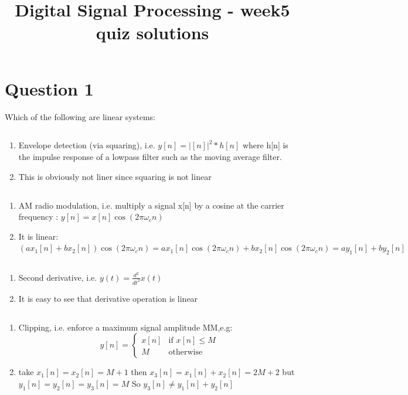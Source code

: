 \documentclass[a4paper]{article}
\title{Digital Signal Processing - week5 quiz solutions}
\begin{document}
\maketitle

\section{Question 1}
Which of the following are linear systems:

\subsection{} 
\begin{enumerate}
\item Envelope detection (via squaring), i.e. $y[n] = \vert[n]\vert^2 \ast h[n]$
 where h[n] is the impulse response of a lowpass filter such as the moving average filter.
\item This is obviously not liner since squaring is not linear
\end{enumerate}

\subsection{}
\begin{enumerate}
\item AM radio modulation, i.e. multiply a signal x[n] by a cosine at the carrier frequency :
$y[n]= x[n]\cos(2\pi\omega_cn)$
\item It is linear:  $(ax_1[n]+bx_2[n])\cos(2\pi\omega_cn) = ax_1[n]\cos(2\pi\omega_cn)+bx_2[n]\cos(2\pi\omega_cn) = ay_1[n]+by_2[n]$
\end{enumerate}

\subsection{}
\begin{enumerate}
\item Second derivative, i.e. $y(t) = \frac{d^2}{dt^2}x(t)$
\item It is easy to see that derivative operation is linear
\end{enumerate}

\subsection{}
\begin{enumerate}
\item Clipping, i.e. enforce a maximum signal amplitude MM,e.g: 
$$
y[n] = \begin{cases} x[n] &\mbox{if } x[n] \leq M  \\
M & \mbox{otherwise } \end{cases} 
$$
\item take $x_1[n]=x_2[n] =M+1$ then $x_3[n] = x_1[n]+x_2[n] = 2M+2$ but $y_1[n]=y_2[n] = y_3[n] = M$
So $y_3[n] \ne y_1[n] + y_2[n]$
\end{enumerate}
\end{document}
